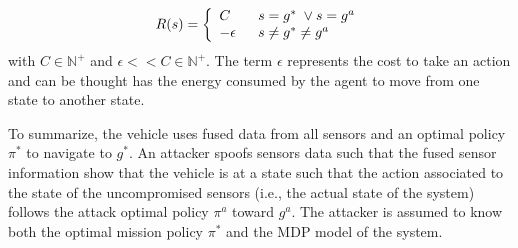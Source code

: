 \documentclass[letterpaper, 10 pt, conference]{ieeeconf}  %
\newcommand{\Ne}{\mathbb {N}}
\newcommand\NB[1]{$\spadesuit$\footnote{NB: #1}}
\begin{document}
%
  \begin{equation}
    R(s)=\left\{
                \begin{array}{ll}
                  C\hspace{2em} s = g^* \; \vee s = g^a \\
                  -\epsilon\hspace{1.6em} s \ne g^* \ne g^a
                \end{array}
              \right.
  \end{equation}
with $C \in \Ne^+$  and $\epsilon << C \in \Ne^+ $. The term $\epsilon$ represents the cost to take an action and can be thought has the energy consumed by the agent to move from one state to another state.

To summarize, the vehicle uses fused data from all sensors and an optimal policy $\pi^*$ to navigate to $g^*$. An attacker spoofs sensors data such that the fused sensor information show that the vehicle is at a state such that the  action associated to the state of the uncompromised sensors (i.e., the actual state of the system) follows the attack optimal policy $\pi^a$ toward $g^a$. The attacker is assumed to know both the optimal mission policy $\pi^*$ and the MDP model of the system.   
\end{document}
